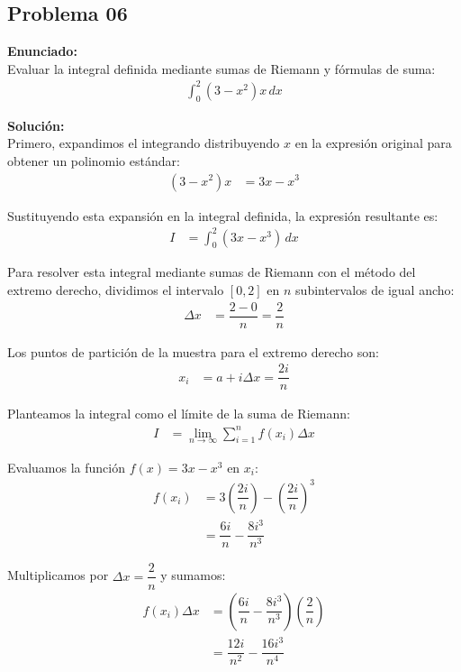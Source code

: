 \subsection*{Problema 06}

\noindent\textbf{Enunciado:} \\
Evaluar la integral definida mediante sumas de Riemann y fórmulas de suma:
\begin{align*}
\int_{0}^{2} (3 - x^2) x \, dx
\end{align*}

\noindent\textbf{Solución:} \\
Primero, expandimos el integrando distribuyendo $x$ en la expresión original para obtener un polinomio estándar:
\begin{align*}
(3 - x^2)x &= 3x - x^3
\end{align*}

Sustituyendo esta expansión en la integral definida, la expresión resultante es:
\begin{align*}
I &= \int_{0}^{2} (3x - x^3) \, dx
\end{align*}

Para resolver esta integral mediante sumas de Riemann con el método del extremo derecho, dividimos el intervalo $[0, 2]$ en $n$ subintervalos de igual ancho:
\begin{align*}
\Delta x &= \dfrac{2 - 0}{n} = \dfrac{2}{n}
\end{align*}

Los puntos de partición de la muestra para el extremo derecho son:
\begin{align*}
x_i &= a + i\Delta x = \dfrac{2i}{n}
\end{align*}

Planteamos la integral como el límite de la suma de Riemann:
\begin{align*}
I &= \lim_{n \to \infty} \sum_{i=1}^{n} f(x_i) \Delta x
\end{align*}

Evaluamos la función $f(x) = 3x - x^3$ en $x_i$:
\begin{align*}
f(x_i) &= 3\left(\dfrac{2i}{n}\right) - \left(\dfrac{2i}{n}\right)^{\!3} \\
&= \dfrac{6i}{n} - \dfrac{8i^3}{n^3}
\end{align*}

Multiplicamos por $\Delta x = \dfrac{2}{n}$ y sumamos:
\begin{align*}
f(x_i)\Delta x &= \left(\dfrac{6i}{n} - \dfrac{8i^3}{n^3}\right)\left(\dfrac{2}{n}\right) \\
&= \dfrac{12i}{n^2} - \dfrac{16i^3}{n^4}
\end{align*}

